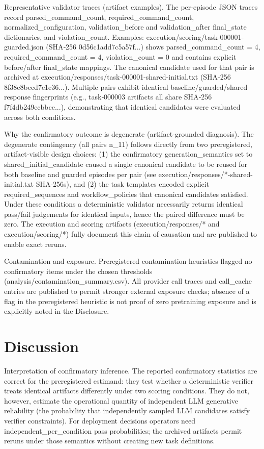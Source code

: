 \documentclass[conference]{IEEEtran}
\begin{document}
Representative validator traces (artifact examples). The per‑episode JSON traces record parsed\_command\_count, required\_command\_count, normalized\_configuration, validation\_before and validation\_after final\_state dictionaries, and violation\_count. Examples: execution/scoring/task-000001-guarded.json (SHA‑256 0d56c1add7c5a57f...) shows parsed\_command\_count = 4, required\_command\_count = 4, violation\_count = 0 and contains explicit before/after final\_state mappings. The canonical candidate used for that pair is archived at execution/responses/task-000001-shared-initial.txt (SHA‑256 8f38c8becd7e1e36...). Multiple pairs exhibit identical baseline/guarded/shared response fingerprints (e.g., task‑000003 artifacts all share SHA‑256 f7f4db249ecbbce...), demonstrating that identical candidates were evaluated across both conditions.

Why the confirmatory outcome is degenerate (artifact‑grounded diagnosis). The degenerate contingency (all pairs n\_11) follows directly from two preregistered, artifact‑visible design choices: (1) the confirmatory generation\_semantics set to shared\_initial\_candidate caused a single canonical candidate to be reused for both baseline and guarded episodes per pair (see execution/responses/*-shared-initial.txt SHA‑256s), and (2) the task templates encoded explicit required\_sequences and workflow\_policies that canonical candidates satisfied. Under these conditions a deterministic validator necessarily returns identical pass/fail judgements for identical inputs, hence the paired difference must be zero. The execution and scoring artifacts (execution/responses/* and execution/scoring/*) fully document this chain of causation and are published to enable exact reruns.

Contamination and exposure. Preregistered contamination heuristics flagged no confirmatory items under the chosen thresholds (analysis/contamination\_summary.csv). All provider call traces and call\_cache entries are published to permit stronger external exposure checks; absence of a flag in the preregistered heuristic is not proof of zero pretraining exposure and is explicitly noted in the Disclosure.

\section{Discussion}
Interpretation of confirmatory inference. The reported confirmatory statistics are correct for the preregistered estimand: they test whether a deterministic verifier treats identical artifacts differently under two scoring conditions. They do not, however, estimate the operational quantity of independent LLM generative reliability (the probability that independently sampled LLM candidates satisfy verifier constraints). For deployment decisions operators need independent\_per\_condition pass probabilities; the archived artifacts permit reruns under those semantics without creating new task definitions.
\end{document}
